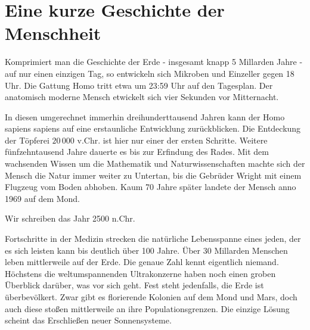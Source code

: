 \chapter[Prolog]{Eine kurze Geschichte der Menschheit}

Komprimiert man die Geschichte der Erde - insgesamt knapp 5 Millarden Jahre - auf nur einen einzigen Tag, so entwickeln sich Mikroben und Einzeller gegen
18 Uhr. Die Gattung Homo tritt etwa um 23:59 Uhr auf den Tagesplan. Der anatomisch moderne Mensch etwickelt sich vier Sekunden vor Mitternacht.

In diesen umgerechnet immerhin dreihunderttausend Jahren kann der Homo sapiens sapiens auf eine erstaunliche Entwicklung zurückblicken. Die Entdeckung der
Töpferei $20\,000$ v.Chr. ist hier nur einer der ersten Schritte. Weitere fünfzehntausend Jahre dauerte es bis zur Erfindung des Rades. Mit dem wachsenden
Wissen um die Mathematik und Naturwissenschaften machte sich der Mensch die Natur immer weiter zu Untertan, bis die Gebrüder Wright mit einem Flugzeug vom
Boden abhoben. Kaum 70 Jahre später landete der Mensch anno 1969 auf dem Mond.

Wir schreiben das Jahr 2500 n.Chr.

Fortschritte in der Medizin strecken die natürliche Lebensspanne eines jeden, der es sich leisten kann bis deutlich über 100 Jahre. Über 30 Millarden
Menschen leben mittlerweile auf der Erde. Die genaue Zahl kennt eigentlich niemand. Höchstens die weltumspannenden Ultrakonzerne haben noch einen groben
Überblick darüber, was vor sich geht. Fest steht jedenfalls, die Erde ist überbevölkert. Zwar gibt es florierende Kolonien auf dem Mond und Mars, doch auch
diese stoßen mittlerweile an ihre Populationsgrenzen. Die einzige Lösung scheint das Erschließen neuer Sonnensysteme.

